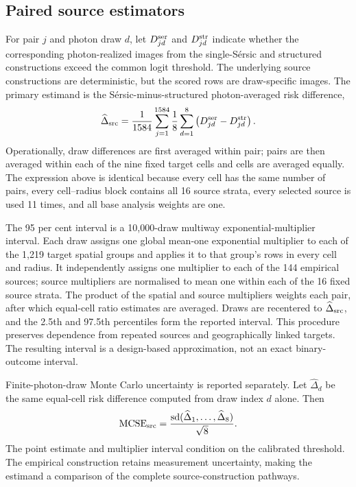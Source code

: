 \subsection{Paired source estimators}
\label{sec:paired_source_estimators}

For pair \(j\) and photon draw \(d\), let \(D^{\rm ser}_{jd}\) and
\(D^{\rm str}_{jd}\) indicate whether the corresponding photon-realized images
from the single-S\'{e}rsic and structured constructions exceed the common
logit threshold. The underlying source constructions are deterministic, but
the scored rows are draw-specific images. The primary estimand is the
S\'{e}rsic-minus-structured photon-averaged risk difference,
\begin{equation}
\widehat\Delta_{\rm src}
=\frac{1}{1584}\sum_{j=1}^{1584}\frac{1}{8}\sum_{d=1}^{8}
 \left(D^{\rm ser}_{jd}-D^{\rm str}_{jd}\right).
\label{eq:psrc_risk_difference}
\end{equation}
Operationally, draw differences are first averaged within pair; pairs are
then averaged within each of the nine fixed target cells and cells are
averaged equally. The expression above is identical because every cell has
the same number of pairs, every cell--radius block contains all 16 source
strata, every selected source is used 11 times, and all base analysis weights
are one.

The 95 per cent interval is a 10,000-draw multiway exponential-multiplier
interval. Each draw assigns one global mean-one exponential multiplier to
each of the 1,219 target spatial groups and applies it to that group's rows in
every cell and radius. It independently assigns one multiplier to each of the
144 empirical sources; source multipliers are normalised to mean one within
each of the 16 fixed source strata. The product of the spatial and source
multipliers weights each pair, after which equal-cell ratio estimates are
averaged. Draws are recentered to \(\widehat\Delta_{\rm src}\), and the 2.5th
and 97.5th percentiles form the reported interval. This procedure preserves
dependence from repeated sources and geographically linked targets. The
resulting interval is a design-based approximation, not an exact
binary-outcome interval.

Finite-photon-draw Monte Carlo uncertainty is reported separately. Let
\(\widehat\Delta_d\) be the same equal-cell risk difference computed from
draw index \(d\) alone. Then
\begin{equation}
 {\rm MCSE}_{\rm src}
 =\frac{{\rm sd}(\widehat\Delta_1,\ldots,\widehat\Delta_8)}{\sqrt{8}} .
\label{eq:psrc_mcse}
\end{equation}
The point estimate and multiplier interval condition on the
calibrated threshold. The empirical construction retains measurement
uncertainty, making the estimand a comparison of the complete
source-construction pathways.

